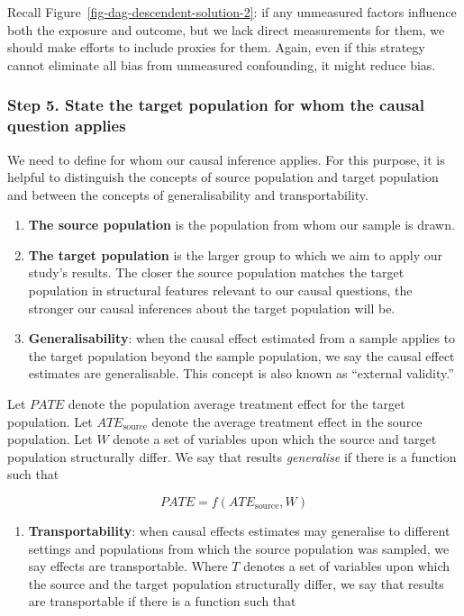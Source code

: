 \documentclass[
  singlecolumn]{article}
\providecommand{\tightlist}{%
  \setlength{\itemsep}{0pt}\setlength{\parskip}{0pt}}\usepackage{longtable,booktabs,array}
\begin{document}
Recall Figure~\ref{fig-dag-descendent-solution-2}: if any unmeasured
factors influence both the exposure and outcome, but we lack direct
measurements for them, we should make efforts to include proxies for
them. Again, even if this strategy cannot eliminate all bias from
unmeasured confounding, it might reduce bias.

\hypertarget{step-5.-state-the-target-population-for-whom-the-causal-question-applies}{%
\subsubsection{Step 5. State the target population for whom the causal
question
applies}\label{step-5.-state-the-target-population-for-whom-the-causal-question-applies}}

We need to define for whom our causal inference applies. For this
purpose, it is helpful to distinguish the concepts of source population
and target population and between the concepts of generalisability and
transportability.

\begin{enumerate}
\def\labelenumi{\arabic{enumi}.}
\item
  \textbf{The source population} is the population from whom our sample
  is drawn.
\item
  \textbf{The target population} is the larger group to which we aim to
  apply our study's results. The closer the source population matches
  the target population in structural features relevant to our causal
  questions, the stronger our causal inferences about the target
  population will be.
\item
  \textbf{Generalisability}: when the causal effect estimated from a
  sample applies to the target population beyond the sample population,
  we say the causal effect estimates are generalisable. This concept is
  also known as ``external validity.''
\end{enumerate}

Let \(PATE\) denote the population average treatment effect for the
target population. Let \(ATE_{\text{source}}\) denote the average
treatment effect in the source population. Let \(W\) denote a set of
variables upon which the source and target population structurally
differ. We say that results \emph{generalise} if there is a function
such that

\[PATE =  f(ATE_{\text{source}}, W)\]

\begin{enumerate}
\def\labelenumi{\arabic{enumi}.}
\setcounter{enumi}{3}
\tightlist
\item
  \textbf{Transportability}: when causal effects estimates may
  generalise to different settings and populations from which the source
  population was sampled, we say effects are transportable. Where \(T\)
  denotes a set of variables upon which the source and the target
  population structurally differ, we say that results are transportable
  if there is a function such that
\end{enumerate}
\end{document}
